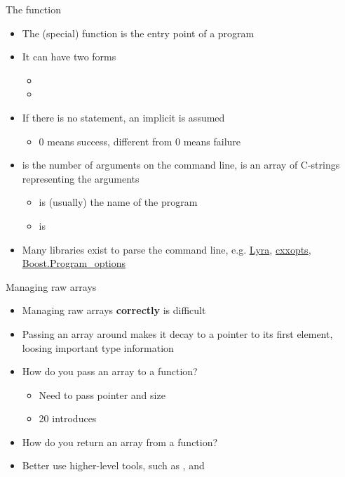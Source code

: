 \begin{frame}{The  function}
  \begin{itemize}
  \item The  (special) function is the entry point of a program
  \item It can have two forms
    \begin{itemize}
    \item {}
    \item {}
    \end{itemize}
  \item If there is no  statement, an implicit  is assumed
    \begin{itemize}
    \item $0$ means success, different from $0$ means failure
    \end{itemize}
  \item {} is the number of arguments on the command line, 
    is an array of C-strings representing the arguments
    \begin{itemize}
    \item {} is (usually) the name of the program
    \item {} is 
    \end{itemize}
  \item Many libraries exist to parse the command line, e.g.
    \href{https://github.com/bfgroup/Lyra}{Lyra},
    \href{https://github.com/jarro2783/cxxopts}{cxxopts},
    \href{https://www.boost.org/doc/libs/release/libs/program_options/}{Boost.Program_options}
  \end{itemize}
\end{frame}

\begin{frame}{Managing raw arrays}

  \begin{itemize}
  \item Managing raw arrays \textbf{correctly} is difficult
  \item Passing an array around makes it decay to a pointer to its first
    element, loosing important type information
  \item How do you pass an array to a function?
    \begin{itemize}
    \item Need to pass pointer and size
    \item \Cpp{}20 introduces 
    \end{itemize}
  \item How do you return an array from a function?
  \item Better use higher-level tools, such as ,
     and 
  \end{itemize}
\end{frame}

